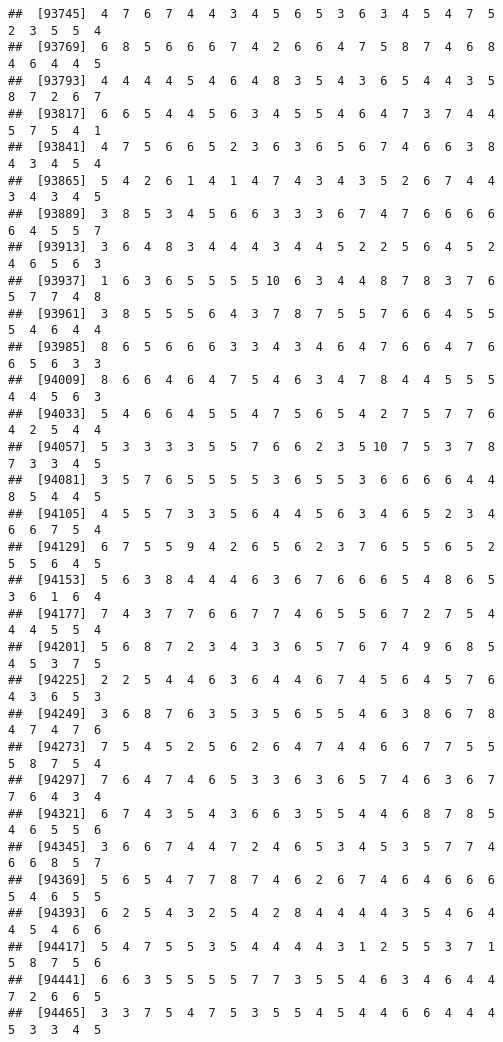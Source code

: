 \documentclass[
]{book}
\begin{document}
\begin{verbatim}
##  [93745]  4  7  6  7  4  4  3  4  5  6  5  3  6  3  4  5  4  7  5  2  3  5  5  4
##  [93769]  6  8  5  6  6  6  7  4  2  6  6  4  7  5  8  7  4  6  8  4  6  4  4  5
##  [93793]  4  4  4  4  5  4  6  4  8  3  5  4  3  6  5  4  4  3  5  8  7  2  6  7
##  [93817]  6  6  5  4  4  5  6  3  4  5  5  4  6  4  7  3  7  4  4  5  7  5  4  1
##  [93841]  4  7  5  6  6  5  2  3  6  3  6  5  6  7  4  6  6  3  8  4  3  4  5  4
##  [93865]  5  4  2  6  1  4  1  4  7  4  3  4  3  5  2  6  7  4  4  3  4  3  4  5
##  [93889]  3  8  5  3  4  5  6  6  3  3  3  6  7  4  7  6  6  6  6  6  4  5  5  7
##  [93913]  3  6  4  8  3  4  4  4  3  4  4  5  2  2  5  6  4  5  2  4  6  5  6  3
##  [93937]  1  6  3  6  5  5  5  5 10  6  3  4  4  8  7  8  3  7  6  5  7  7  4  8
##  [93961]  3  8  5  5  5  6  4  3  7  8  7  5  5  7  6  6  4  5  5  5  4  6  4  4
##  [93985]  8  6  5  6  6  6  3  3  4  3  4  6  4  7  6  6  4  7  6  6  5  6  3  3
##  [94009]  8  6  6  4  6  4  7  5  4  6  3  4  7  8  4  4  5  5  5  4  4  5  6  3
##  [94033]  5  4  6  6  4  5  5  4  7  5  6  5  4  2  7  5  7  7  6  4  2  5  4  4
##  [94057]  5  3  3  3  3  5  5  7  6  6  2  3  5 10  7  5  3  7  8  7  3  3  4  5
##  [94081]  3  5  7  6  5  5  5  5  3  6  5  5  3  6  6  6  6  4  4  8  5  4  4  5
##  [94105]  4  5  5  7  3  3  5  6  4  4  5  6  3  4  6  5  2  3  4  6  6  7  5  4
##  [94129]  6  7  5  5  9  4  2  6  5  6  2  3  7  6  5  5  6  5  2  5  5  6  4  5
##  [94153]  5  6  3  8  4  4  4  6  3  6  7  6  6  6  5  4  8  6  5  3  6  1  6  4
##  [94177]  7  4  3  7  7  6  6  7  7  4  6  5  5  6  7  2  7  5  4  4  4  5  5  4
##  [94201]  5  6  8  7  2  3  4  3  3  6  5  7  6  7  4  9  6  8  5  4  5  3  7  5
##  [94225]  2  2  5  4  4  6  3  6  4  4  6  7  4  5  6  4  5  7  6  4  3  6  5  3
##  [94249]  3  6  8  7  6  3  5  3  5  6  5  5  4  6  3  8  6  7  8  4  7  4  7  6
##  [94273]  7  5  4  5  2  5  6  2  6  4  7  4  4  6  6  7  7  5  5  5  8  7  5  4
##  [94297]  7  6  4  7  4  6  5  3  3  6  3  6  5  7  4  6  3  6  7  7  6  4  3  4
##  [94321]  6  7  4  3  5  4  3  6  6  3  5  5  4  4  6  8  7  8  5  4  6  5  5  6
##  [94345]  3  6  6  7  4  4  7  2  4  6  5  3  4  5  3  5  7  7  4  6  6  8  5  7
##  [94369]  5  6  5  4  7  7  8  7  4  6  2  6  7  4  6  4  6  6  6  5  4  6  5  5
##  [94393]  6  2  5  4  3  2  5  4  2  8  4  4  4  4  3  5  4  6  4  4  5  4  6  6
##  [94417]  5  4  7  5  5  3  5  4  4  4  4  3  1  2  5  5  3  7  1  5  8  7  5  6
##  [94441]  6  6  3  5  5  5  5  7  7  3  5  5  4  6  3  4  6  4  4  7  2  6  6  5
##  [94465]  3  3  7  5  4  7  5  3  5  5  4  5  4  4  6  6  4  4  4  5  3  3  4  5

\end{verbatim}
\end{document}
